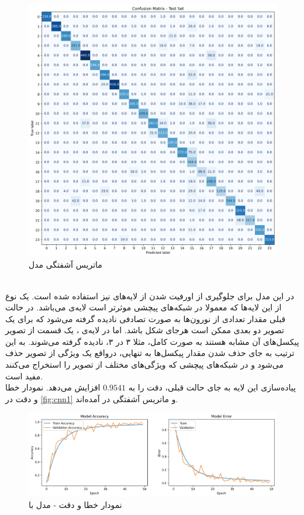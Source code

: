 \documentclass[11pt]{article}
\begin{document}
	\begin{figure}[!h]
		\centerline{\includegraphics[width=0.5\linewidth]{../HW3_2/cnn1 cm.png}}
		\caption{ماتریس آشفتگی مدل }
		\label{fig:cnn1_cm}
	\end{figure}\\
	در این مدل برای جلوگیری از اورفیت شدن از لایه‌های  نیز استفاده شده است. یک نوع از این لایه‌ها که معمولا در شبکه‌های پیچشی موثرتر است لایه‌ی  می‌باشد. در حالت قبلی مقدار تعدادی از نورون‌ها به صورت تصادفی نادیده گرفته می‌شود که برای یک تصویر دو بعدی ممکن است هرجای شکل باشد. اما در لایه‌ی ، یک قسمت از تصویر پیکسل‌های آن مشابه هستند به صورت کامل، مثلا ۳ در ۳، نادیده گرفته می‌شوند. به این ترتیب به جای حذف شدن مقدار پیکسل‌ها به تنهایی، درواقع یک ویژگی از تصویر حذف می‌شود و در شبکه‌های پیچشی که ویژگی‌های مختلف از تصویر را استخراج می‌کنند مفید است.\\
	پیاده‌سازی این لایه به جای حالت قبلی، دقت را به $0.9541$ افزایش می‌دهد. نمودار خطا و دقت در
	\autoref{fig:cnn1}
و ماتریس آشفتگی در
آمده‌اند.\\
	\begin{figure}[!h]
		\centerline{\includegraphics[width=1\linewidth]{../HW3_2/cnn2.png}}
		\caption{نمودار خطا و دقت  - مدل  با }
		\label{fig:cnn2}
	\end{figure}
\end{document}
